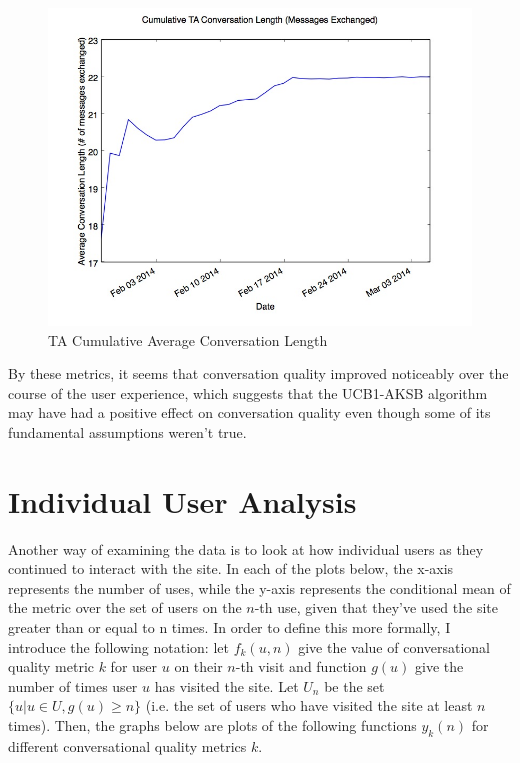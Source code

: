 \begin{figure}[H]
\centering
\includegraphics[trim= 0mm 0mm 0mm 0mm, clip, scale=0.5]{./Figures/CumulativeTAConversationLength(MessagesExchanged).jpg}
\caption{TA Cumulative Average Conversation Length}
\label{fig:TAMessagesExchangedCumulative}
\end{figure}

By these metrics, it seems that conversation quality improved noticeably over the course of the user experience, which suggests that the UCB1-AKSB algorithm may have had a positive effect on conversation quality even though some of its fundamental assumptions weren't true.

\section{Individual User Analysis}

Another way of examining the data is to look at how individual users as they continued to interact with the site. In each of the plots below, the x-axis represents the number of uses, while the y-axis represents the conditional mean of the metric over the set of users on the $n$-th use, given that they've used the site greater than or equal to n times. In order to define this more formally, I introduce the following notation: let $f_k(u, n)$ give the value of conversational quality metric $k$ for user $u$ on their $n$-th visit and function $g(u)$ give the number of times user $u$ has visited the site. Let $U_n$ be the set $\{u | u \in {U}, g(u) \geq{n}\}$ (i.e. the set of users who have visited the site at least $n$ times). Then, the graphs below are plots of the following functions $y_k(n)$ for different conversational quality metrics $k$.

